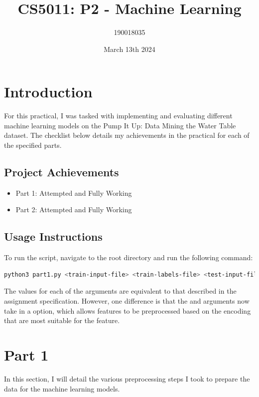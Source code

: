 \documentclass{article}
\title{CS5011: P2 - Machine Learning}
\author{190018035}
\date{March 13th 2024}
\begin{document}
\maketitle

\tableofcontents

\section{Introduction}
For this practical, I was tasked with implementing and evaluating different machine learning models on the Pump It Up: Data Mining the Water Table \cite{DrivenData} dataset. The checklist below details my achievements in the practical for each of the specified parts.

\subsection{Project Achievements}
\begin{itemize}
    \item{Part 1: Attempted and Fully Working}
    \item{Part 2: Attempted and Fully Working}
\end{itemize}

\subsection{Usage Instructions}

To run the script, navigate to the root directory and run the following command:

\begin{lstlisting}[language=bash]
python3 part1.py <train-input-file> <train-labels-file> <test-input-file> <numerical-preprocessing> <categorical-preprocessing> <model-type> <test-prediction-output-file>
\end{lstlisting}

\noindent The values for each of the arguments are equivalent to that described in the assignment specification. However, one difference is that the  and  arguments now take in a  option, which allows features to be preprocessed based on the encoding that are most suitable for the feature. 

\section{Part 1}
In this section, I will detail the various preprocessing steps I took to prepare the data for the machine learning models.
\end{document}

